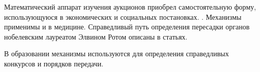 Математический аппарат изучения аукционов приобрел самостоятельную форму, использующуюся в экономических и социальных постановках. \cite{milgrom1982theory}.  Механизмы применимы и в медицине. Справедливый путь определения пересадки органов 
\cite{segev2005kidney} нобелевским лауреатом Элвином Ротом описаны в статьях.

В образовании механизмы используются для определения справедливых конкурсов и порядков передачи.
